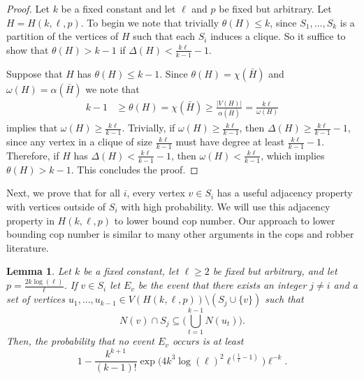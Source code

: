\documentclass[12pt]{amsart}
\newtheorem{lemma}[theorem]{Lemma}
\theoremstyle{definition}
\begin{document}
\begin{proof}
 Let $k$ be a fixed constant and let $\ell$ and $p$ be fixed but arbitrary.
Let $H = H(k,\ell,p)$.
To begin we note that trivially $\theta(H)\leq k$, since $S_1,\dots, S_k$ is a partition of the vertices of $H$ such that each $S_i$ induces a clique.
So it suffice to show that $\theta(H)> k-1$ if $\Delta(H) < \frac{k\ell}{k-1} - 1$.

Suppose that $H$ has $\theta(H) \leq k-1$.
Since $\theta(H) = \chi(\bar{H})$ and $\omega(H) = \alpha(\bar{H})$
we note that 
\begin{align*}
    k - 1 & \geq \theta(H) = \chi(\bar{H}) \geq \frac{|V(H)|}{\alpha(\bar{H})} = \frac{k\ell}{\omega(H)}
\end{align*}
implies that $\omega(H) \geq \frac{k\ell}{k-1}$.
Trivially, if $\omega(H) \geq \frac{k\ell}{k-1}$, then $\Delta(H) \geq \frac{k\ell}{k-1}  - 1$, since any vertex in a clique of size $\frac{k\ell}{k-1}$ must have degree at least $\frac{k\ell}{k-1}  - 1$.
Therefore, if $H$ has $\Delta(H) < \frac{k\ell}{k-1} - 1$,
then $\omega(H) < \frac{k\ell}{k-1}$, which implies $\theta(H) > k-1$.
This
concludes the proof.
\end{proof}


Next, we prove that for all $i$, every vertex $v\in S_i$ has a useful adjacency property with vertices outside of $S_i$ with high probability.
We will use this adjacency property in $H(k,\ell,p)$ to lower bound cop number.
Our approach to lower bounding cop number is similar to many other arguments in the cops and robber literature.


\begin{lemma}\label{Lemma: Always an escape in H}
    Let $k$ be a fixed constant, let $\ell\geq 2$ be fixed but arbitrary, and let $p = \frac{2k\log(\ell)}{\ell}$.
    If $v\in S_i$
    let $E_v$ be the event that there exists an integer $j\neq i$ and a set of vertices $u_1,\dots, u_{k-1} \in V(H(k,\ell,p))\setminus (S_j \cup \{v\})$
    such that 
    \[
    N(v) \cap S_j \subseteq \Big(\bigcup_{t=1}^{k-1} N(u_t) \Big).
    \]
    Then, the probability that no event $E_v$ occurs is at least 
    \[
    1 - \frac{k^{k+1}}{(k-1)!}\exp\Big(4 k^{3} \log(\ell)^2 \ell^{(\frac{1}{\ell}-1)}\Big)\ell^{-k}.
    \]
\end{lemma}
\end{document}
